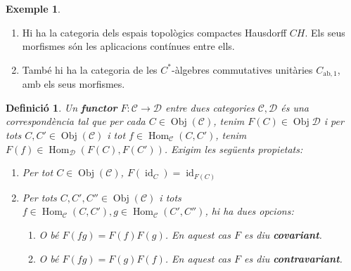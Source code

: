 \documentclass{article}
\newtheorem{definicio}{Definici\'{o}}
\theoremstyle{definition}
\newtheorem{exemple}{Exemple}
\DeclareMathOperator{\Obj}{Obj}
\DeclareMathOperator{\Hom}{Hom}
\DeclareMathOperator{\id}{id}
\begin{document}
\begin{exemple}
\begin{enumerate}
\item Hi ha la categoria dels espais topol\`{o}gics compactes Hausdorff $CH$. Els seus morfismes s\'{o}n les aplicacions cont\'{i}nues entre ells.
\item Tamb\'{e} hi ha la categoria de les $C^*$-\`{a}lgebres commutatives unit\`{a}ries $C_{\text{ab},1}$, amb els seus morfismes.
\end{enumerate}
\end{exemple}

\begin{definicio}
Un \textbf{functor} $F:\mathcal{C}\rightarrow\mathcal{D}$ entre dues categories $\mathcal{C},\mathcal{D}$ \'{e}s una correspond\`{e}ncia tal que per cada $C\in\Obj(\mathcal{C})$, tenim $F(C)\in\Obj\mathcal{D}$ i per tots $C,C'\in\Obj(\mathcal{C})$ i tot $f\in\Hom_{\mathcal{C}}(C,C')$, tenim $F(f)\in\Hom_{\mathcal{D}}(F(C),F(C'))$. Exigim les seg\"{u}ents propietats:
\begin{enumerate}
\item Per tot $C\in\Obj(\mathcal{C})$, $F(\id_C)=\id_{F(C)}$
\item Per tots $C,C',C''\in\Obj(\mathcal{C})$ i tots $f\in\Hom_{\mathcal{C}}(C,C'),g\in\Hom_{\mathcal{C}}(C',C'')$, hi ha dues opcions:
\begin{enumerate}
\item O b\'{e} $F(fg)=F(f)F(g)$. En aquest cas $F$ es diu \textbf{covariant}.
\item O b\'{e} $F(fg)=F(g)F(f)$. En aquest cas $F$ es diu \textbf{contravariant}.
\end{enumerate}
\end{enumerate}
\end{definicio}
\end{document}
